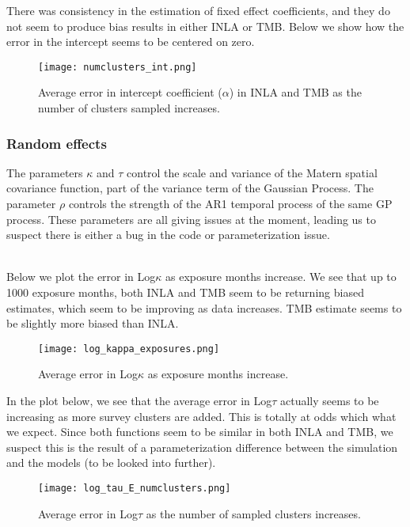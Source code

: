\documentclass[12pt]{article}
\begin{document}
There was consistency in the estimation of fixed effect coefficients, and they do not seem to produce bias results in either INLA or TMB. Below we show how the error in the intercept seems to be centered on zero. 

\begin{figure}[H]
\centering
\texttt{[image: numclusters\_int.png]}
\caption{Average error in intercept coefficient ($\alpha$) in INLA and TMB as the number of clusters sampled increases.}
\end{figure}

\subsubsection{Random effects}

The parameters $\kappa$ and $\tau$ control the scale and variance of the Matern spatial covariance function, part of the variance term of the Gaussian Process. The parameter $\rho$ controls the strength of the AR1 temporal process of the same GP process. These parameters are all giving issues at the moment, leading us to suspect there is either a bug in the code or parameterization issue. \\\

Below we plot the error in Log$\kappa$ as exposure months increase. We see that up to 1000 exposure months, both INLA and TMB seem to be returning biased estimates, which seem to be improving as data increases. TMB estimate seems to be slightly more biased than INLA. 

\begin{figure}[H]
\centering
\texttt{[image: log\_kappa\_exposures.png]}
\caption{Average error in Log$\kappa$ as exposure months increase.}
\end{figure}

In the plot below, we see that the average error in Log$\tau$ actually seems to be increasing as more survey clusters are added. This is totally at odds which what we expect. Since both functions seem to be similar in both INLA and TMB, we suspect this is the result of a parameterization difference between the simulation and the models (to be looked into further). 

\begin{figure}[H]
\centering
\texttt{[image: log\_tau\_E\_numclusters.png]}
\caption{Average error in Log$\tau$ as the number of sampled clusters increases.}
\end{figure}
\end{document}

